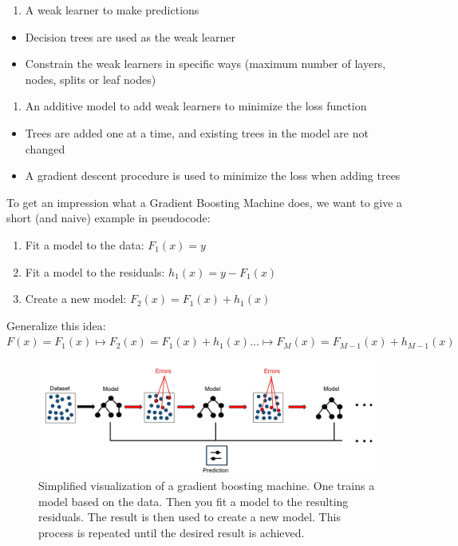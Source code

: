 \documentclass[]{krantz}
\providecommand{\tightlist}{%
  \setlength{\itemsep}{0pt}\setlength{\parskip}{0pt}}
\begin{document}
\begin{enumerate}
\def\labelenumi{\arabic{enumi}.}
\setcounter{enumi}{1}
\tightlist
\item
  A weak learner to make predictions
\end{enumerate}

\begin{itemize}
\tightlist
\item
  Decision trees are used as the weak learner
\item
  Constrain the weak learners in specific ways (maximum number of
  layers, nodes, splits or leaf nodes)
\end{itemize}

\begin{enumerate}
\def\labelenumi{\arabic{enumi}.}
\setcounter{enumi}{2}
\tightlist
\item
  An additive model to add weak learners to minimize the loss function
\end{enumerate}

\begin{itemize}
\tightlist
\item
  Trees are added one at a time, and existing trees in the model are not
  changed
\item
  A gradient descent procedure is used to minimize the loss when adding
  trees
\end{itemize}

To get an impression what a Gradient Boosting Machine does, we want to
give a short (and naive) example in pseudocode:

\begin{enumerate}
\def\labelenumi{\arabic{enumi}.}
\tightlist
\item
  Fit a model to the data: \(F_1(x)=y\)
\item
  Fit a model to the residuals: \(h_1(x)=y-F_1(x)\)
\item
  Create a new model: \(F_2(x)=F_1(x)+h_1(x)\)
\end{enumerate}

Generalize this idea:
\(F(x)=F_1(x)\mapsto F_2(x)=F_1(x)+h_1(x) ... \mapsto F_M(x)=F_{M-1}(x)+h_{M-1}(x)\)

\begin{figure}

{\centering \includegraphics[width=0.7\linewidth]{images/ExampleGBM2} 

}

\caption{Simplified visualization of a gradient boosting machine. One trains a model based on the data. Then you fit a model to the resulting residuals. The result is then used to create a new model. This process is repeated until the desired result is achieved.}\label{fig:unnamed-chunk-46}
\end{figure}
\end{document}
